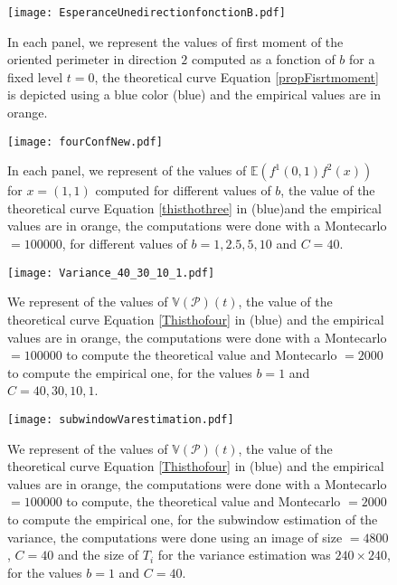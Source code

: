 \documentclass[12pt]{article}
\theoremstyle{Theorem}
\theoremstyle{definition}
\begin{document}
\begin{figure}[H]
  \centering
    {\texttt{[image: EsperanceUnedirectionfonctionB.pdf]}}
    \hspace{0.2cm}
 \caption{In each panel, we represent the values of first moment of the oriented perimeter in direction $2$ computed as a fonction of $b$ for a fixed level $t = 0$, the theoretical curve Equation \eqref{propFisrtmoment} is depicted using a blue color (blue) and the empirical values are in orange.}
\label{figsubwindow}
\end{figure}

\begin{figure}[H]
  \centering
    {\texttt{[image: fourConfNew.pdf]}}
    \hspace{0.2cm}
 \caption{In each panel, we represent of the values of $\mathbb{E}\left(f^{1}(0,1)f^{2}(x)\right)$ for $x = (1, 1)$ computed for different values of $b$, the value of the theoretical curve Equation \eqref{thisthothree} in (blue)and the empirical values are in orange, the computations were done with a Montecarlo $= 100000$, for different values of $b = 1, 2.5, 5, 10$ and $C = 40$. }
\label{figfourConNew}
\end{figure}

\begin{figure}[H]
  \centering
    {\texttt{[image: Variance\_40\_30\_10\_1.pdf]}}
    \hspace{0.2cm}
 \caption{We represent of the values of $\mathbb{V}\left(\mathcal{P}\right)(t)$, the value of the theoretical curve Equation \eqref{Thisthofour} in (blue) and the empirical values are in orange, the computations were done with a Montecarlo $= 100000$ to compute the theoretical value and Montecarlo $= 2000$ to compute the empirical one, for the values $b = 1$ and $C = 40, 30, 10,1$. }
\label{figVariance}
\end{figure}
\begin{figure}[H]
  \centering
    {\texttt{[image: subwindowVarestimation.pdf]}}
    \hspace{0.2cm}
 \caption{We represent of the values of $\mathbb{V}\left(\mathcal{P}\right)(t)$, the value of the theoretical curve Equation \eqref{Thisthofour} in (blue) and the empirical values are in orange, the computations were done with a Montecarlo $= 100000$ to compute, the theoretical value and Montecarlo $= 2000$ to compute the empirical one, for the subwindow estimation of the variance, the computations were done using an image of size $= 4800$, $C = 40$ and the size of $T_{i}$ for the variance estimation was $240\times240$, for the values $b = 1$ and $C = 40$. }
\label{figSubwindowVariance}
\end{figure}
\end{document}
